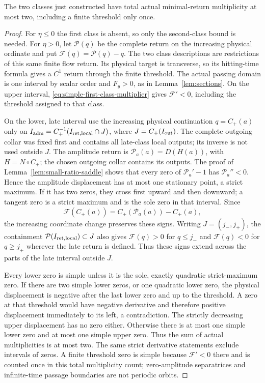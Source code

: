 \begin{lemma}
\label{lem:simple-two-class-gluing}
The two classes just constructed have total actual minimal-return
multiplicity at most two, including a finite threshold only once.
\end{lemma}
\begin{proof}
For $\eta\le0$ the first class is absent, so only the second-class
bound is needed. For $\eta>0$, let $\mathcal P(q)$ be the complete
return on the increasing physical ordinate and put
$\mathcal F(q)=\mathcal P(q)-q$. The two class descriptions are
restrictions of this same finite flow return. Its physical target is
transverse, so its hitting-time formula gives a $C^1$ return through
the finite threshold. The actual passing domain is one interval by
scalar order and $F_y>0$, as in Lemma~\ref{lem:sections}.
On the upper interval, \eqref{eq:simple-first-class-multiplier} gives
$\mathcal F'<0$, including the threshold assigned to that class.

On the lower, late interval use the increasing physical continuation
$q=C_+(a)$ only on $I_{\rm adm}=C_+^{-1}(I_{\rm ret,local}\cap J)$, where
$J=C_+(I_{\rm out})$. The complete outgoing collar was fixed first and contains
all late-class local outputs; its inverse is not used outside $J$.
The amplitude return is
$\mathcal P_a(a)=D(H(a))$, with $H=N\circ C_+$; the chosen
outgoing collar contains its outputs. The proof of
Lemma~\ref{lem:small-ratio-saddle} shows that every zero of
$\mathcal P_a'-1$ has $\mathcal P_a''<0$. Hence the amplitude displacement
has at most one stationary point, a strict maximum. If it has two
zeros, they cross first upward and then downward; a tangent zero is
a strict maximum and is the sole zero in that interval. Since
\[
 \mathcal F(C_+(a))=C_+(\mathcal P_a(a))-C_+(a),
\]
the increasing coordinate change preserves these signs.
Writing $J=(j_-,j_+)$, the containment
$\mathcal P(I_{\rm ret,local})\subset J$ also gives
$\mathcal F(q)>0$ for $q\le j_-$ and
$\mathcal F(q)<0$ for $q\ge j_+$ wherever the late return is defined.
Thus these signs extend across the parts of the late interval outside $J$.

Every lower zero is simple unless it is the sole, exactly quadratic
strict-maximum zero. If there are two simple lower zeros, or one
quadratic lower zero, the physical displacement is negative after the
last lower zero and up to the threshold. A zero at that threshold
would have negative derivative and therefore positive displacement
immediately to its left, a contradiction. The strictly decreasing
upper displacement has no zero either. Otherwise there is at most one
simple lower zero and at most one simple upper zero. Thus the sum of
actual multiplicities is at most two. The same
strict derivative statements exclude intervals of zeros. A finite
threshold zero is simple because $\mathcal F'<0$ there and is counted
once in this total multiplicity count; zero-amplitude separatrices and
infinite-time passage boundaries are not periodic orbits.
\end{proof}

